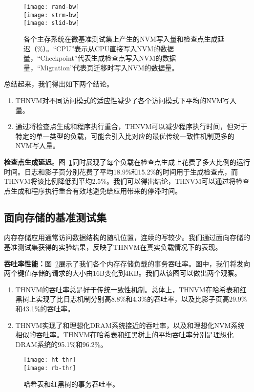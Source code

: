 \begin{figure}[!h]
\centering
\texttt{[image: rand-bw]}\\
\texttt{[image: strm-bw]}\\
\texttt{[image: slid-bw]}\\
\caption{各个主存系统在微基准测试集上产生的NVM写入量和检查点生成延迟（\%）。``CPU''表示从CPU直接写入NVM的数据量，``Checkpoint''代表生成检查点写入NVM的数据量，``Migration''代表页迁移时写入NVM的数据量。}
\label{fig:micro-bw}
\end{figure}

总结起来，我们得出如下两个结论。
\begin{enumerate}
\item THNVM对不同访问模式的适应性减少了各个访问模式下平均的NVM写入量。 
\item 通过将检查点生成和程序执行重合，THNVM可以减少程序执行时间，但对于特定的单一类型的负载，可能会引入比对应的最优传统一致性机制更多的NVM写入量。
\end{enumerate}

\textbf{检查点生成延迟}。图~\ref{fig:micro-bw}同时展现了每个负载在检查点生成上花费了多大比例的运行时间。日志和影子页分别花费了平均18.9\%和15.2\%的时间用于生成检查点，而THNVM将该比例降低到平均2.5\%。我们可以得出结论，THNVM可以通过将检查点生成和程序执行重合有效地避免给应用带来的停滞时间。 

\subsection{面向存储的基准测试集}

内存存储应用通常访问数据结构的随机位置，连续的写较少。我们通过面向存储的基准测试集获得的实验结果，反映了THNVM在真实负载情况下的表现。

\textbf{吞吐率性能：}图~\ref{fig:rb-thr}展示了我们各个内存存储负载的事务吞吐率。图中，我们将发向两个键值存储的请求的大小由16B变化到4KB。我们从该图可以做出两个观察。
\begin{enumerate}
\item THNVM的吞吐率总是好于传统一致性机制。总体上，THNVM在哈希表和红黑树上实现了比日志机制分别高8.8\%和4.3\%的吞吐率，以及比影子页高29.9\%和43.1\%的吞吐率。
\item THNVM实现了和理想化DRAM系统接近的吞吐率，以及和理想化NVM系统相似的吞吐率。THNVM在哈希表和红黑树上的平均吞吐率分别是理想化DRAM系统的95.1\%和96.2\%。
\end{enumerate}

\begin{figure}[!h]
  \centering
  \texttt{[image: ht-thr]}\\
  \texttt{[image: rb-thr]}\\
  \caption{哈希表和红黑树的事务吞吐率。}
  \label{fig:rb-thr}
\end{figure}

